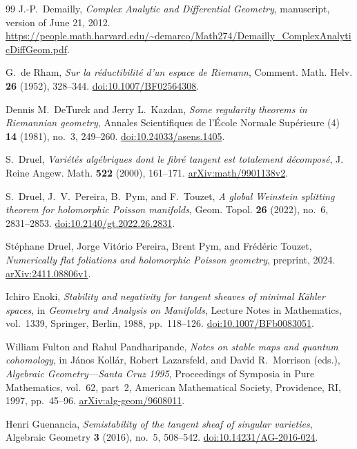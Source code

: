 \begin{thebibliography}{99}
J.-P.~Demailly,
\emph{Complex Analytic and Differential Geometry},
manuscript, version of June 21, 2012.
\url{https://people.math.harvard.edu/~demarco/Math274/Demailly_ComplexAnalyticDiffGeom.pdf}.

G.~de Rham,
\emph{Sur la r\'eductibilit\'e d'un espace de Riemann},
Comment. Math. Helv. \textbf{26} (1952), 328--344.
\href{https://doi.org/10.1007/BF02564308}{doi:10.1007/BF02564308}.

Dennis M.~DeTurck and Jerry L.~Kazdan,
\emph{Some regularity theorems in Riemannian geometry},
Annales Scientifiques de l'\'Ecole Normale Sup\'erieure (4)
\textbf{14} (1981), no.~3, 249--260.
\href{https://doi.org/10.24033/asens.1405}{doi:10.24033/asens.1405}.

S.~Druel,
\emph{Vari\'et\'es alg\'ebriques dont le fibr\'e tangent est totalement d\'ecompos\'e},
J. Reine Angew. Math. \textbf{522} (2000), 161--171.
\href{https://arxiv.org/abs/math/9901138v2}{arXiv:math/9901138v2}.

S.~Druel, J.~V.~Pereira, B.~Pym, and F.~Touzet,
\emph{A global Weinstein splitting theorem for holomorphic Poisson manifolds},
Geom. Topol. \textbf{26} (2022), no.~6, 2831--2853.
\href{https://doi.org/10.2140/gt.2022.26.2831}{doi:10.2140/gt.2022.26.2831}.

St\'ephane Druel, Jorge Vit\'orio Pereira, Brent Pym, and Fr\'ed\'eric Touzet,
\emph{Numerically flat foliations and holomorphic Poisson geometry},
preprint, 2024.
\href{https://arxiv.org/abs/2411.08806v1}{arXiv:2411.08806v1}.

Ichiro Enoki,
\emph{Stability and negativity for tangent sheaves of minimal K\"ahler spaces},
in \emph{Geometry and Analysis on Manifolds}, Lecture Notes in Mathematics,
vol.~1339, Springer, Berlin, 1988, pp.~118--126.
\href{https://doi.org/10.1007/BFb0083051}{doi:10.1007/BFb0083051}.

William Fulton and Rahul Pandharipande,
\emph{Notes on stable maps and quantum cohomology},
in J\'anos Koll\'ar, Robert Lazarsfeld, and David R.~Morrison (eds.),
\emph{Algebraic Geometry---Santa Cruz 1995},
Proceedings of Symposia in Pure Mathematics, vol.~62, part~2,
American Mathematical Society, Providence, RI, 1997, pp.~45--96.
\href{https://arxiv.org/abs/alg-geom/9608011}{arXiv:alg-geom/9608011}.

Henri Guenancia,
\emph{Semistability of the tangent sheaf of singular varieties},
Algebraic Geometry \textbf{3} (2016), no.~5, 508--542.
\href{https://doi.org/10.14231/AG-2016-024}{doi:10.14231/AG-2016-024}.


\end{thebibliography}
